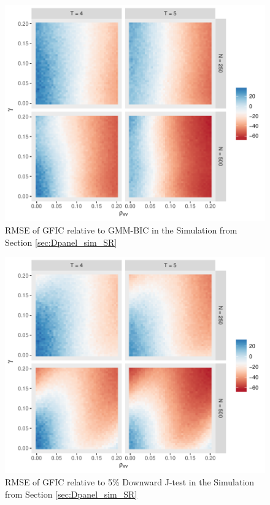 \begin{figure}
\centering
\includegraphics[scale = 0.8]{./simulations/DynamicPanel/results/Dpanel_GFIC_RMSE_rel_BIC}
\caption{RMSE of GFIC relative to GMM-BIC in the Simulation from Section \ref{sec:Dpanel_sim_SR}}
\end{figure}
\begin{figure}
\centering
\includegraphics[scale = 0.8]{./simulations/DynamicPanel/results/Dpanel_GFIC_RMSE_rel_J5}
\caption{RMSE of GFIC relative to 5\% Downward J-test in the Simulation from Section \ref{sec:Dpanel_sim_SR}}
\end{figure}

